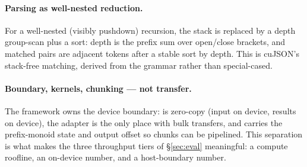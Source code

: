 \paragraph{Parsing as well-nested reduction.}
For a well-nested (visibly pushdown) recursion, the stack is replaced by a
depth group-scan plus a sort: depth is the prefix sum over open/close brackets,
and matched pairs are adjacent tokens after a stable sort by depth.  This is
\textsf{cuJSON}'s stack-free matching, derived from the grammar rather than
special-cased.

\paragraph{Boundary, kernels, chunking --- not transfer.}
The framework owns the device boundary:  is zero-copy
(input on device, results on device), the  adapter is the only
place with bulk transfers, and  carries the prefix-monoid
state and output offset so chunks can be pipelined.  This separation is what
makes the three throughput tiers of \S\ref{sec:eval} meaningful: a compute
roofline, an on-device number, and a host-boundary number.
